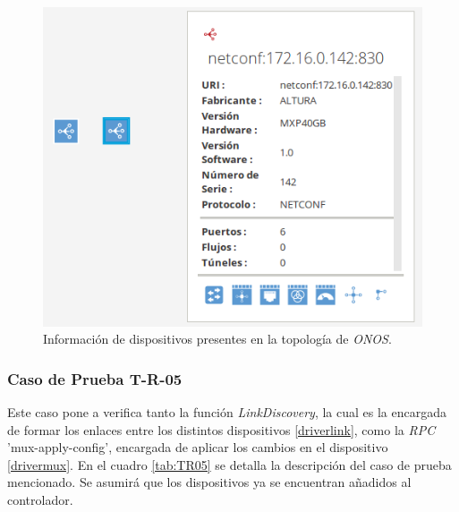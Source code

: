   \begin{figure}[H]
	\centering
	\includegraphics[scale=0.5]{Figures/test4_consulta.png}
	\caption{Información de dispositivos presentes en la topología de \textit{ONOS}.}
	\label{fig:test4_consulta}
  \end{figure}

  \subsubsection{Caso de Prueba T-R-05}

  Este caso pone a verifica tanto la función \textit{LinkDiscovery}, la cual es la encargada de formar los enlaces entre los distintos dispositivos \ref{driverlink}, como la  \textit{RPC} 'mux-apply-config', encargada de aplicar los cambios en el dispositivo \ref{drivermux}. 
  En el cuadro \ref{tab:TR05} se detalla la descripción del caso de prueba mencionado. Se asumirá que los dispositivos ya se encuentran añadidos al controlador.
  


